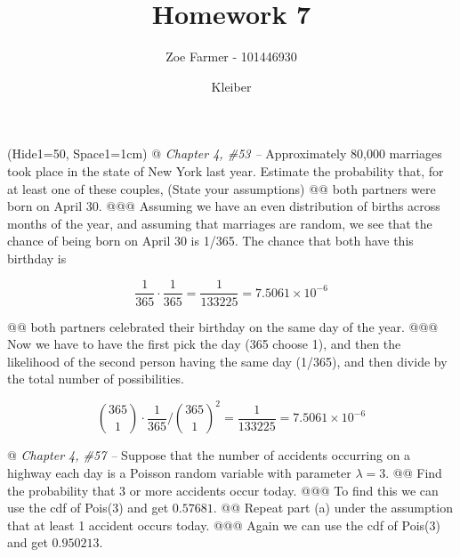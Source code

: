 \documentclass[10pt]{article}
\title{Homework 7}
\date{Kleiber}
\author{Zoe Farmer - 101446930}
\begin{document}
\maketitle

\begin{table}[!ht]
    \centering
\end{table}

\begin{easylist}[enumerate]
    \ListProperties(Hide1=50, Space1=1cm)
    @ \textit{Chapter 4, \#53 --} Approximately 80,000 marriages took place in the state of New York last year. Estimate
    the probability that, for at least one of these couples, (State your assumptions)
    @@ both partners were born on April 30.
    @@@ Assuming we have an even distribution of births across months of the year, and assuming that marriages are
    random, we see that the chance of being born on April 30 is 1/365. The chance that both have this birthday is

    \[
        \frac{1}{365} \cdot \frac{1}{365} = \frac{1}{133225} = \boxed{7.5061 \times 10^{-6}}
    \]

    @@ both partners celebrated their birthday on the same day of the year.
    @@@ Now we have to have the first pick the day (365 choose 1), and then the likelihood of the second person having
    the same day (1/365), and then divide by the total number of possibilities.

    \[ \binom{365}{1} \cdot \frac{1}{365} \Big / \binom{365}{1}^2 = \frac{1}{133225} = \boxed{7.5061 \times 10^{-6}} \]

    @ \textit{Chapter 4, \#57 --} Suppose that the number of accidents occurring on a highway each day is a Poisson
    random variable with parameter $\lambda = 3$.
    @@ Find the probability that 3 or more accidents occur today.
    @@@ To find this we can use the cdf of Pois(3) and get $\boxed{0.57681}$.
    @@ Repeat part (a) under the assumption that at least 1 accident occurs today.
    @@@ Again we can use the cdf of Pois(3) and get $\boxed{0.950213}$.


\end{easylist}
\end{document}
